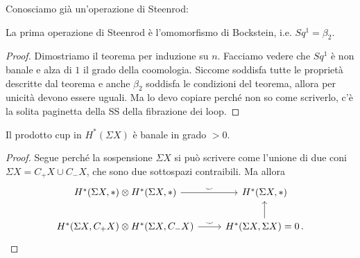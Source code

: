 Conosciamo già un'operazione di Steenrod:
\begin{prop}
	La prima operazione di Steenrod è l'omomorfismo di Bockstein, i.e. $Sq^{1}=\beta_{2}$.
	\begin{proof}
		Dimostriamo il teorema per induzione su $n$.
		Facciamo vedere che $Sq^{1}$ è non banale e alza di $1$
		il grado della coomologia. Siccome soddisfa tutte le proprietà descritte dal
		teorema e anche $\beta_{2}$ soddisfa le condizioni del teorema,
		allora per unicità devono essere uguali.
		Ma lo devo copiare perché non so come scriverlo, c'è la solita paginetta
		della SS della fibrazione dei loop.
	\end{proof}
\end{prop}

\begin{lemma}
	Il prodotto cup in $H^{*}(\Sigma X)$ è banale
	in grado $> 0$.
	\begin{proof}
		Segue perché la sospensione $\Sigma X$ 
		si può scrivere come l'unione di due coni
		$\Sigma X = C_{+}X \cup C_{-}X$,
		che sono due sottospazi contraibili.
		Ma allora
		\begin{equation*}
			\begin{tikzcd}
			H^{*}(\Sigma X, \ast) \otimes H^{*}(\Sigma X, \ast)
			\ar[r, "\smile"] & H^{*}(\Sigma X, \ast) \\
			H^{*}(\Sigma X, C_{+}X) \otimes H^{*}(\Sigma X, C_{-}X)
			 \ar[r, "\smile"] & H^{*}(\Sigma X, \Sigma X) = 0 \ar[u] \,.
			\end{tikzcd}
		\end{equation*}
	\end{proof}
\end{lemma}